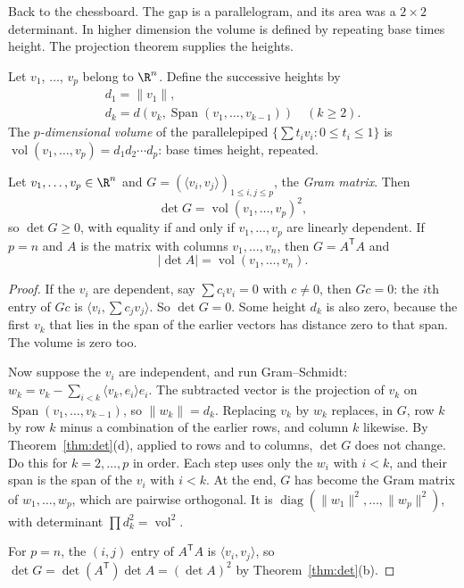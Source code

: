 Back to the chessboard. The gap is a parallelogram, and its area was a $2\times2$ determinant. In higher dimension the volume is defined by repeating base times height. The projection theorem supplies the heights.

\begin{definitionx}[volume]
Let $v_1$, $\dots$, $v_p$ belong to $\R^n$. Define the successive heights by
\[
\begin{gathered}
d_1=\|v_1\|,\\
d_k=d\left(v_k,\operatorname{Span}(v_1,\dots,v_{k-1})\right)\quad(k\ge2).
\end{gathered}
\]
The \emph{$p$-dimensional volume} of the parallelepiped $\{\sum t_iv_i:0\le t_i\le1\}$ is $\operatorname{vol}(v_1,\dots,v_p)=d_1d_2\cdots d_p$: base times height, repeated.
\end{definitionx}

\begin{theorem}\label{thm:gram}
Let $v_1,\dots,v_p\in\R^n$ and $G=\left(\langle v_i,v_j\rangle\right)_{1\le i,j\le p}$, the \emph{Gram matrix}. Then
\[
\det G=\operatorname{vol}(v_1,\dots,v_p)^2 ,
\]
so $\det G\ge0$, with equality if and only if $v_1,\dots,v_p$ are linearly dependent. If $p=n$ and $A$ is the matrix with columns $v_1,\dots,v_n$, then $G=A^{\mathsf T}A$ and
\[
|\det A|=\operatorname{vol}(v_1,\dots,v_n).
\]
\end{theorem}
\begin{proof}
If the $v_i$ are dependent, say $\sum c_iv_i=0$ with $c\ne0$, then $Gc=0$: the $i$th entry of $Gc$ is $\langle v_i,\sum c_jv_j\rangle$. So $\det G=0$. Some height $d_k$ is also zero, because the first $v_k$ that lies in the span of the earlier vectors has distance zero to that span. The volume is zero too.

Now suppose the $v_i$ are independent, and run Gram--Schmidt: $w_k=v_k-\sum_{i<k}\langle v_k,e_i\rangle e_i$. The subtracted vector is the projection of $v_k$ on $\operatorname{Span}(v_1,\dots,v_{k-1})$, so $\|w_k\|=d_k$. Replacing $v_k$ by $w_k$ replaces, in $G$, row $k$ by row $k$ minus a combination of the earlier rows, and column $k$ likewise. By Theorem~\ref{thm:det}(d), applied to rows and to columns, $\det G$ does not change. Do this for $k=2,\dots,p$ in order. Each step uses only the $w_i$ with $i<k$, and their span is the span of the $v_i$ with $i<k$. At the end, $G$ has become the Gram matrix of $w_1,\dots,w_p$, which are pairwise orthogonal. It is $\operatorname{diag}(\|w_1\|^2,\dots,\|w_p\|^2)$, with determinant $\prod d_k^2=\operatorname{vol}^2$.

For $p=n$, the $(i,j)$ entry of $A^{\mathsf T}A$ is $\langle v_i,v_j\rangle$, so $\det G=\det(A^{\mathsf T})\det A=(\det A)^2$ by Theorem~\ref{thm:det}(b).
\end{proof}

